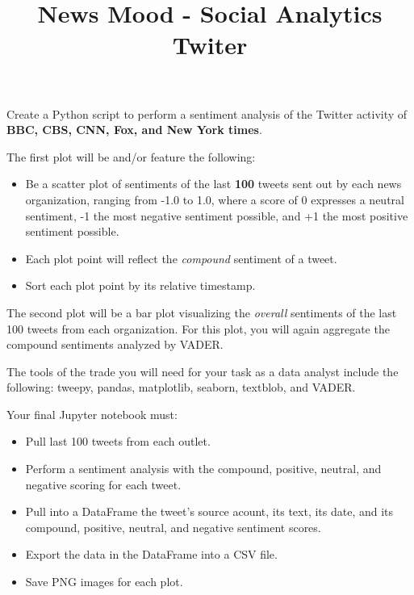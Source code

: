 \documentclass[11pt]{article}
\title{News Mood - Social Analytics Twiter}
\providecommand{\tightlist}{%
      \setlength{\itemsep}{0pt}\setlength{\parskip}{0pt}}
\begin{document}
    
    
    \maketitle
    
    

    
    Create a Python script to perform a sentiment analysis of the Twitter
activity of \textbf{BBC, CBS, CNN, Fox, and New York times}.

The first plot will be and/or feature the following:

\begin{itemize}
\tightlist
\item
  Be a scatter plot of sentiments of the last \textbf{100} tweets sent
  out by each news organization, ranging from -1.0 to 1.0, where a score
  of 0 expresses a neutral sentiment, -1 the most negative sentiment
  possible, and +1 the most positive sentiment possible.
\item
  Each plot point will reflect the \emph{compound} sentiment of a tweet.
\item
  Sort each plot point by its relative timestamp.
\end{itemize}

The second plot will be a bar plot visualizing the \emph{overall}
sentiments of the last 100 tweets from each organization. For this plot,
you will again aggregate the compound sentiments analyzed by VADER.

The tools of the trade you will need for your task as a data analyst
include the following: tweepy, pandas, matplotlib, seaborn, textblob,
and VADER.

Your final Jupyter notebook must:

\begin{itemize}
\tightlist
\item
  Pull last 100 tweets from each outlet.
\item
  Perform a sentiment analysis with the compound, positive, neutral, and
  negative scoring for each tweet.
\item
  Pull into a DataFrame the tweet's source acount, its text, its date,
  and its compound, positive, neutral, and negative sentiment scores.
\item
  Export the data in the DataFrame into a CSV file.
\item
  Save PNG images for each plot.
\end{itemize}
\end{document}

